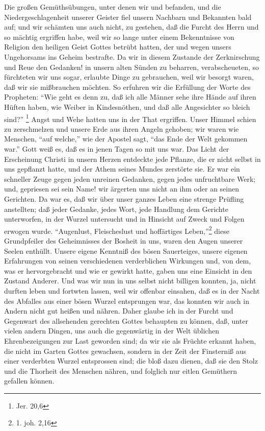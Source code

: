 Die großen Gemüthsübungen, unter denen wir und befanden, und die Niedergeschlagenheit unserer Geister fiel unsern Nachbarn und Bekannten bald auf; und wir schämten uns auch nicht, zu gestehen, daß die Furcht des Herrn und so mächtig ergriffen habe, weil wir so lange unter einem Bekenntnisse von Religion den heiligen Geist Gottes betrübt hatten, der und wegen unsers Ungehorsams ins Geheim bestrafte. Da wir in diesem Zustande der Zerknirschung und Reue den Gedanken! in unsern alten Sünden zu beharren, verabscheueten, so fürchteten wir uns sogar, erlaubte Dinge zu gebrauchen, weil wir besorgt waren, daß wir sie mißbrauchen möchten. So erfuhren wir die Erfüllung der Worte des Propheten: "`Wie geht es denn zu, daß ich alle Männer sehe ihre Hände auf ihren Hüften haben, wie Weiber in Kindesnöthen, und daß alle Angesichter so bleich sind?"' \footnote{Jer. 20,6} Angst und Wehe hatten uns in der That ergriffen. Unser Himmel schien zu zerschmelzen und unsere Erde aus ihren Angeln gehoben; wir waren wie Menschen, "`auf welche,"' wie der Apostel sagt, "`das Ende der Welt gekommen war."'  Gott weiß es, daß es in jenen Tagen so mit uns war. Das Licht der Erscheinung Christi in unsern Herzen entdeckte jede Pflanze, die er nicht selbst in uns gepflanzt hatte, und der Athem seines Mundes zerstörte sie. Er war ein schneller Zeuge gegen jeden unreinen Gedanken, gegen jedes unfruchtbare Werk; und, gepriesen sei sein Name! wir ärgerten uns nicht an ihm oder an seinen Gerichten. Da war es, daß wir über unser ganzes Leben eine strenge Prüfling anstellten; daß jeder Gedanke, jedes Wort, jede Handlung dem Gerichte unterworfen, in der Wurzel untersucht und in Hinsicht auf Zweck und Folgen erwogen wurde. "`Augenlust, Fleischeslust und hoffärtiges Leben,"'\footnote{1. joh. 2,16} diese Grundpfeiler des Geheimnisses der Bosheit in uns, waren den Augen unserer Seelen enthüllt. Unsere eigene Kenntniß des bösen Sauerteiges, unsere eigenen Erfahrungen von seinen verschiedenen verderblichen Wirkungen und, von dem, was er hervorgebracht und wie er gewirkt hatte, gaben uns eine Einsicht in den Zustand Anderer. Und was wir nun in uns selbst nicht billigen konnten, ja, nicht durften leben und fortwten lassen, weil wir offenbar einsahen, daß es in der Nacht des Abfalles aus einer bösen Wurzel entsprungen war, das konnten wir auch in Andern nicht gut heißen und nähren. Daher glaube ich in der Furcht und Gegenwart des allsehenden gerechten Gottes behaupten zu können, daß, unter vielen andern Dingen, uns auch die gegenwärtig in der Welt üblichen Ehrenbezeigungen zur Last geworden sind; da wir sie als Früchte erkannt haben, die nicht im Garten Gottes gewachsen, sondern in der Zeit der Finsterniß aus einer verderbten Wurzel entsprossen sind; die bloß dazu dienen, daß sie den Stolz und die Thorheit des Menschen nähren, und folglich nur eitlen Gemüthern gefallen können.

